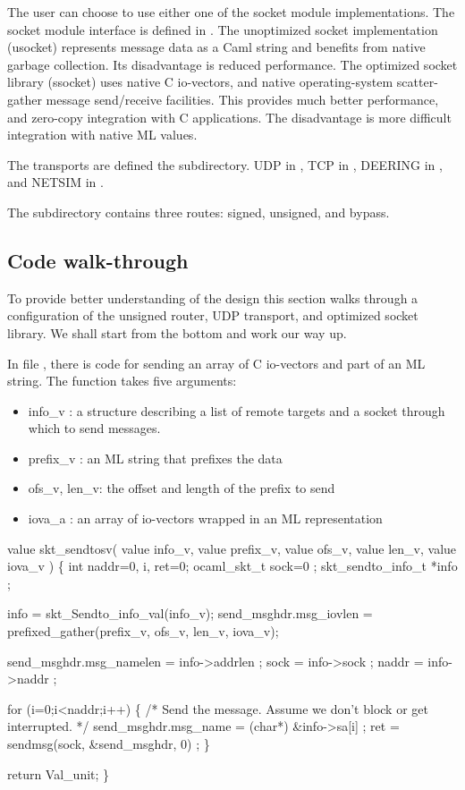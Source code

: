 The user can choose to use either one of the socket module
implementations. The socket module interface is defined in
. The unoptimized socket implementation
(usocket) represents message data as a Caml string and benefits from
native garbage collection. Its disadvantage is reduced
performance. The optimized socket library (ssocket) uses native C
io-vectors, and native operating-system scatter-gather message
send/receive facilities. This provides much better performance, and
zero-copy integration with C applications. The disadvantage is more
difficult integration with native ML values. 

The transports are defined the  subdirectory. 
UDP in , TCP in ,
DEERING in , and NETSIM in
.

The  subdirectory contains three routes: signed,
unsigned, and bypass.

\subsection{Code walk-through}
To provide better understanding of the design this section walks
through a configuration of the unsigned router, UDP transport, 
and optimized socket library. We shall start from the bottom
and work our way up. 

In file , there is code for sending an
array of C io-vectors and part of an ML string. The function takes
five arguments:
\begin{itemize}
\item info\_v : a structure describing a list of remote targets and a
socket through which to send messages.
\item prefix\_v : an ML string that prefixes the data
\item ofs\_v, len\_v: the offset and length of the prefix to send
\item iova\_a : an array of io-vectors wrapped in an ML representation
\end{itemize}

\begin{codebox}
value skt_sendtosv(
	value info_v,
	value prefix_v,
	value ofs_v,
	value len_v,
	value iova_v
) \{
  int naddr=0, i, ret=0;
  ocaml_skt_t sock=0 ;
  skt_sendto_info_t *info ;

  info = skt_Sendto_info_val(info_v);
  send_msghdr.msg_iovlen = prefixed_gather(prefix_v, ofs_v, len_v, iova_v); 

  send_msghdr.msg_namelen = info->addrlen ;
  sock = info->sock ;
  naddr = info->naddr ;

  for (i=0;i<naddr;i++) \{
    /* Send the message.  Assume we don't block or get interrupted.  
     */
    send_msghdr.msg_name = (char*) &info->sa[i] ;
    ret = sendmsg(sock, &send_msghdr, 0) ;
  \}

  return Val_unit;
\}
\end{codebox}


